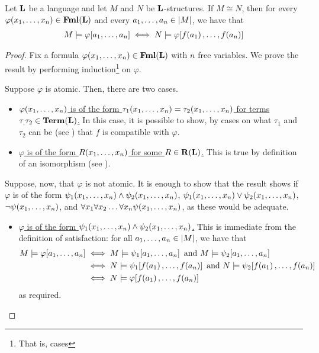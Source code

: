 \begin{boxtheorem}
    Let $\mathbf{L}$ be a language and let $M$ and $N$ be $\mathbf{L}$-structures. If $M \cong N$, then for every $\varphi\!\left( x_1, \ldots, x_n \right) \in \mathbf{Fml}\!\left( \mathbf{L} \right)$ and every $a_1, \ldots, a_n \in \left\lvert M \right\rvert$, we have that
    \begin{align*}
        M \models \varphi\!\left[ a_1, \ldots, a_n \right]
        \iff 
        N \models \varphi\!\left[ f\!\left( a_1 \right), \ldots, f\!\left( a_n \right) \right]
    \end{align*}
\end{boxtheorem}
\begin{proof}
    Fix a formula $\varphi\!\left( x_1, \ldots, x_n \right) \in \mathbf{Fml}\!\left( \mathbf{L} \right)$ with $n$ free variables. We prove the result by performing induction\footnote{That is, cases} on $\varphi$.
    
    Suppose $\varphi$ is atomic. Then, there are two cases.
    \begin{itemize}
        \item \underline{$\varphi\!\left( x_1, \ldots, x_n \right)$ is of the form $\tau_1\!\left( x_1, \ldots, x_n \right) = \tau_2\!\left( x_1, \ldots, x_n \right)$ for terms $\tau_, \tau_2 \in \mathbf{Term}\!\left( \mathbf{L} \right)$.}
        In this case, it is possible to show, by cases on what $\tau_1$ and $\tau_2$ can be (see ) that $f$ is compatible with $\varphi$.

        \item \underline{$\varphi$ is of the form $R\!\left( x_1, \ldots, x_n \right)$ for some $R \in \mathbf{R}\!\left( \mathbf{L} \right)$.}
        This is true by definition of an isomorphism (see ).
    \end{itemize}

    Suppose, now, that $\varphi$ is not atomic. It is enough to show that the result shows if $\varphi$ is of the form $\psi_1\!\left( x_1, \ldots, x_n \right) \land \psi_2\!\left( x_1, \ldots, x_n \right)$, $\psi_1\!\left( x_1, \ldots, x_n \right) \lor \psi_2\!\left( x_1, \ldots, x_n \right)$, $\neg \psi\!\left( x_1, \ldots, x_n \right)$, and $\forall x_1 \forall x_2 \ldots \forall x_{n} \psi\!\left( x_1, \ldots, x_n \right)$, as these would be adequate.

    \begin{itemize}
        \item \underline{$\varphi$ is of the form $\psi_1\!\left( x_1, \ldots, x_n \right) \land \psi_2\!\left( x_1, \ldots, x_n \right)$.}
        This is immediate from the definition of satisfaction: for all $a_1, \ldots, a_n \in \left\lvert M \right\rvert$, we have that
        \begin{align*}
            M \models \varphi\!\brac{a_1, \ldots, a_n}
            & \iff
            M \models \psi_1\!\brac{a_1, \ldots, a_n}
            \text{ and }
            M \models \psi_2\!\brac{a_1, \ldots, a_n} \\
            & \iff
            N \models \psi_1\!\brac{f\of{a_1}, \ldots, f\of{a_n}}
            \text{ and }
            N \models \psi_2\!\brac{f\of{a_1}, \ldots, f\of{a_n}} \\
            &\iff
            N \models \varphi\!\brac{f\of{a_1}, \ldots, f\of{a_n}}
        \end{align*}
        as required.


\end{itemize}
\end{proof}
